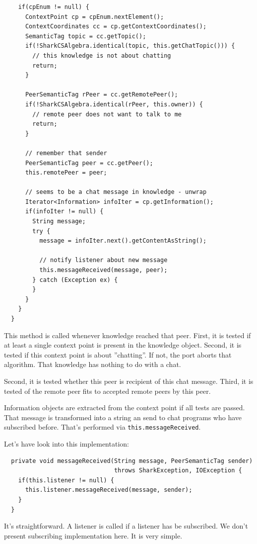{\begin{verbatim}
    if(cpEnum != null) {
      ContextPoint cp = cpEnum.nextElement();
      ContextCoordinates cc = cp.getContextCoordinates();
      SemanticTag topic = cc.getTopic();
      if(!SharkCSAlgebra.identical(topic, this.getChatTopic())) {
        // this knowledge is not about chatting
        return;
      }

      PeerSemanticTag rPeer = cc.getRemotePeer();
      if(!SharkCSAlgebra.identical(rPeer, this.owner)) {
        // remote peer does not want to talk to me
        return;
      }

      // remember that sender
      PeerSemanticTag peer = cc.getPeer();
      this.remotePeer = peer;

      // seems to be a chat message in knowledge - unwrap
      Iterator<Information> infoIter = cp.getInformation();
      if(infoIter != null) {
        String message;
        try {
          message = infoIter.next().getContentAsString();

          // notify listener about new message
          this.messageReceived(message, peer);
        } catch (Exception ex) {
        }
      }
    }
  }
\end{verbatim}

This method is called whenever knowledge reached that peer. First, it is tested if at least a single context point is present in the knowledge object. Second, it is tested if this context point is about ''chatting''. If not, the port aborts that algorithm. That knowledge has nothing to do with a chat.

Second, it is tested whether this peer is recipient of this chat message. Third, it is tested of the remote peer fits to accepted remote peers by this peer.

Information objects are extracted from the context point if all tests are passed. That message is transformed into a string an send to chat programs who have subscribed before. That's performed via {\tt this.messageReceived}.

Let's have look into this implementation:
\begin{verbatim}
  private void messageReceived(String message, PeerSemanticTag sender)
                               throws SharkException, IOException {
    if(this.listener != null) {
      this.listener.messageReceived(message, sender);
    }
  }
\end{verbatim}

It's straightforward. A listener is called if a listener has be subscribed. We don't present subscribing implementation here. It is very simple.

}
